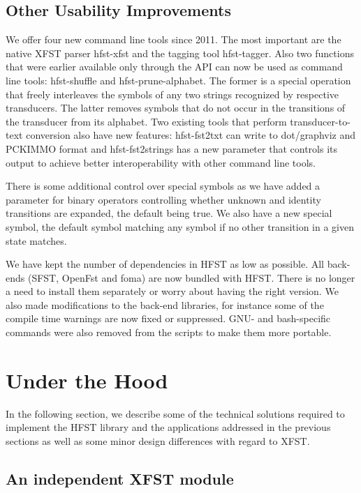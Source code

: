 \documentclass{llncs}
\begin{document}
\subsection{Other Usability Improvements}

We offer four new command line tools since 2011. The most important are the native XFST
parser hfst-xfst and the tagging tool hfst-tagger. Also two functions
that were earlier available only through the API can now be used as
command line tools: hfst-shuffle and hfst-prune-alphabet. The former is a special operation 
that freely interleaves the symbols of any two strings recognized by respective transducers.    
The latter removes symbols that do not occur in the transitions of the transducer from its alphabet. 
Two existing tools that perform transducer-to-text conversion also have new features: 
hfst-fst2txt can write to dot/graphviz
and PCKIMMO format and hfst-fst2strings has a new parameter that
controls its output to achieve better interoperability with other
command line tools.

There is some additional control over special symbols as we have added a parameter
for binary operators controlling whether unknown and identity transitions
are expanded, the default being true. We also have a new special
symbol, the default symbol matching any symbol if no other
transition in a given state matches.

We have kept the number of dependencies in HFST as low as possible.
All back-ends (SFST, OpenFst and foma) are now bundled with
HFST. There is no longer a need to install them separately or worry about
having the right version. We also made modifications to the
back-end libraries, for instance some of the compile time warnings are now fixed or
suppressed. GNU- and bash-specific commands were also removed from
the scripts to make them more portable.

\section{Under the Hood}\label{hfst:solutions}

In the following section, we describe some of the technical solutions required to implement the HFST library and the applications addressed in the previous sections as well as some minor design differences with regard to XFST.

\subsection{An independent XFST module}
\end{document}
